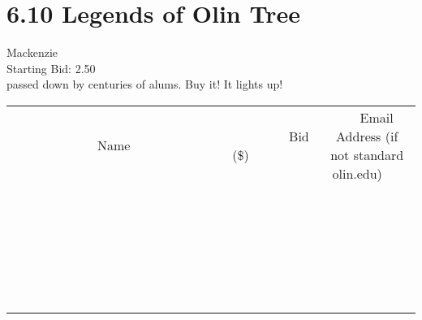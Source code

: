 \documentclass[11pt]{article}
\begin{document}
					\section*{6.10 Legends of Olin Tree}
					Mackenzie \\
					Starting Bid: 2.50 \\
					passed down by centuries of alums. Buy it! It lights up! \\
					[6ex]
					\begin{tabular}{c c c}
						~~~~~~~~~~~~~Name~~~~~~~~~~~~~ & ~~~~~~~~~Bid (\$)~~~~~~~~~ & ~~~Email Address (if not standard olin.edu)~~~ \\
				
 & & \\
\hline
 & & \\
\hline
 & & \\
\hline
 & & \\
\hline
 & & \\
\hline
 & & \\
\hline
 & & \\
\hline
 & & \\
\hline
 & & \\
\hline
 & & \\
\hline
 & & \\
\hline
 & & \\
\hline
 & & \\
\hline
 & & \\
\hline
 & & \\
\hline
 & & \\
\hline
 & & \\
\hline
 & & \\
\hline
 & & \\
\hline
 & & \\
\hline
 & & \\
\hline
 & & \\
\hline
 & & \\
\hline
 & & \\
\hline
 & & \\
\hline
 & & \\
\hline
					\end{tabular}
					\clearpage
				
\end{document}
